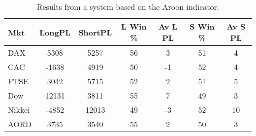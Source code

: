 \begin{table}[ht]
\centering
\caption[Results from a system based on the Aroon indicator]{Results from a system based on the Aroon indicator.} 
\label{tab:aroon_results}
\begin{tabular}{lcccccc}
  \toprule Mkt & LongPL & ShortPL & L Win \% & Av L PL & S Win \% & Av S PL \\ 
  \midrule DAX & 5308 & 5257 & 56 & 3 & 51 & 4 \\ 
  CAC & -1638 & 4919 & 50 & -1 & 52 & 4 \\ 
  FTSE & 3042 & 5715 & 52 & 2 & 51 & 5 \\ 
  Dow & 12131 & 3811 & 55 & 7 & 49 & 3 \\ 
  Nikkei & -4852 & 12013 & 49 & -3 & 52 & 10 \\ 
  AORD & 3735 & 3540 & 55 & 2 & 50 & 3 \\ 
   \bottomrule \end{tabular}
\end{table}

